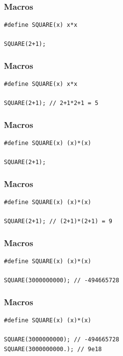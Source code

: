 \documentclass[12pt,compress]{beamer}
\begin{document}
\begin{frame}[fragile]
\frametitle{Macros}

\begin{lstlisting}
#define SQUARE(x) x*x

SQUARE(2+1);
\end{lstlisting}

\end{frame}

\begin{frame}[fragile]
\frametitle{Macros}

\begin{lstlisting}
#define SQUARE(x) x*x

SQUARE(2+1); // 2+1*2+1 = 5
\end{lstlisting}
\end{frame}


\begin{frame}[fragile]
\frametitle{Macros}

\begin{lstlisting}
#define SQUARE(x) (x)*(x)

SQUARE(2+1);
\end{lstlisting}
\end{frame}


\begin{frame}[fragile]
\frametitle{Macros}

\begin{lstlisting}
#define SQUARE(x) (x)*(x)

SQUARE(2+1); // (2+1)*(2+1) = 9
\end{lstlisting}
\end{frame}


\begin{frame}[fragile]
\frametitle{Macros}

\begin{lstlisting}
#define SQUARE(x) (x)*(x)

SQUARE(3000000000); // -494665728
\end{lstlisting}
\end{frame}

\begin{frame}[fragile]
\frametitle{Macros}

\begin{lstlisting}
#define SQUARE(x) (x)*(x)

SQUARE(3000000000); // -494665728
SQUARE(3000000000.); // 9e18
\end{lstlisting}
\end{frame}
\end{document}
